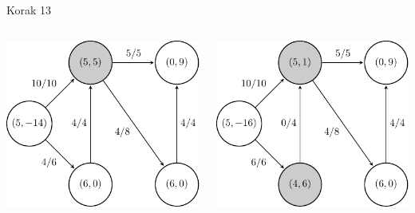 \documentclass{beamer}
\begin{document}
\begin{frame}{Korak 13}
    \begin{columns}
        \begin{column}{0.5\textwidth}
            \centering
            \includegraphics[scale=0.7]{../writing/images/graf2-15.pdf}
        \end{column}

        \begin{column}{0.5\textwidth}
            \centering
            \includegraphics[scale=0.7]{../writing/images/graf2-14.pdf}
        \end{column}
    \end{columns}
\end{frame}
\end{document}
